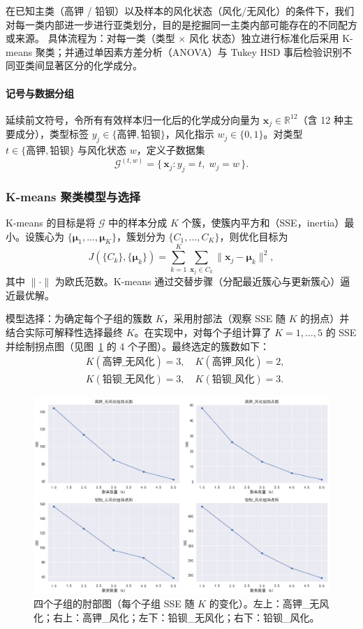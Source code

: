 \documentclass[withoutpreface,bwprint]{cumcmthesis}
\begin{document}
在已知主类（高钾 / 铅钡）以及样本的风化状态（风化/无风化）的条件下，我们对每一类内部进一步进行亚类划分，目的是挖掘同一主类内部可能存在的不同配方或来源。
具体流程为：对每一类（类型 $\times$ 风化 状态）独立进行标准化后采用 K-means 聚类；并通过单因素方差分析（ANOVA）与 Tukey HSD 事后检验识别不同亚类间显著区分的化学成分。

\paragraph{记号与数据分组}
延续前文符号，令所有有效样本归一化后的化学成分向量为 $\mathbf{x}_j\in\mathbb{R}^{12}$（含 12 种主要成分），类型标签 $y_j\in\{\text{高钾},\text{铅钡}\}$，风化指示 $w_j\in\{0,1\}$。对类型 $t\in\{\text{高钾},\text{铅钡}\}$ 与风化状态 $w$，定义子数据集
\[
\mathcal{G}^{(t,w)}=\{\,\mathbf{x}_j: y_j=t,\; w_j=w\,\}.
\]

\subsubsection{K-means 聚类模型与选择}
K-means 的目标是将 $\mathcal{G}$ 中的样本分成 $K$ 个簇，使簇内平方和（SSE，inertia）最小。设簇心为 $\{\boldsymbol{\mu}_1,\dots,\boldsymbol{\mu}_K\}$，簇划分为 $\{C_1,\dots,C_K\}$，则优化目标为
\begin{equation}\label{eq:kmeans_obj}
J(\{C_k\},\{\boldsymbol{\mu}_k\})
=\sum_{k=1}^K\sum_{\mathbf{x}_j\in C_k}\big\|\mathbf{x}_j-\boldsymbol{\mu}_k\big\|^2,
\end{equation}
其中 $\|\cdot\|$ 为欧氏范数。K-means 通过交替步骤（分配最近簇心与更新簇心）逼近最优解。

模型选择：为确定每个子组的簇数 $K$，采用肘部法（观察 SSE 随 $K$ 的拐点）并结合实际可解释性选择最终 $K$。在实现中，对每个子组计算了 $K=1,\dots,5$ 的 SSE 并绘制拐点图（见图~\ref{fig:elbow} 的 4 个子图）。最终选定的簇数如下：
\[
\begin{aligned}
&K(\text{高钾\_无风化})=3, \quad K(\text{高钾\_风化})=2,\\
&K(\text{铅钡\_无风化})=3, \quad K(\text{铅钡\_风化})=3.
\end{aligned}
\]

\begin{figure}[htbp]
    \centering
    \includegraphics[width=0.9\linewidth]{./figures/2.2/1.png}
    \caption{四个子组的肘部图（每个子组 SSE 随 $K$ 的变化）。左上：高钾\_无风化；右上：高钾\_风化；左下：铅钡\_无风化；右下：铅钡\_风化。}
    \label{fig:elbow}
\end{figure}
\end{document}
